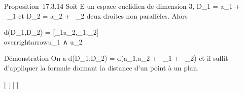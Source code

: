 \documentclass[]{article}
\begin{document}
Proposition~17.3.14 Soit E un espace euclidien de dimension 3,
D_1 = a_1 +
~\overrightarrowu_1 et D_2 =
a_2 + ~\overrightarrowu_2 deux
droites non parallèles. Alors

d(D_1,D_2) = \Big
{[}\overrightarrowa_1a_2,\overrightarrowu_1,\overrightarrowu_2{]}\Big
 \over
\\overrightarrowu_1
∧\overrightarrow
u_2\

Démonstration On a d(D_1,D_2) =
d(a_1,a_2 +
~\overrightarrowu_1 +
~\overrightarrowu_2) et il suffit
d'appliquer la formule donnant la distance d'un point à un plan.

{[}
{[}
{[}
{[}
\end{document}
